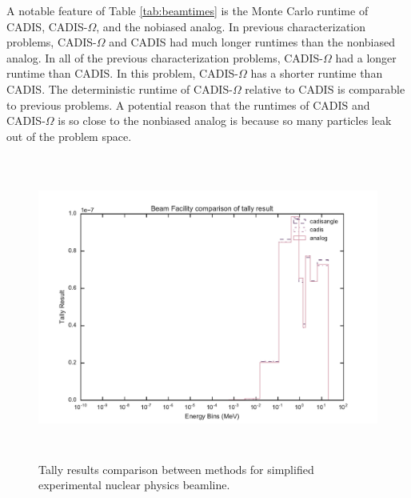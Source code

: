 A notable feature of Table \ref{tab:beamtimes} is the Monte Carlo runtime of
CADIS, CADIS-$\Omega$, and the nobiased analog. In previous characterization
problems, CADIS-$\Omega$ and CADIS had much longer runtimes than the nonbiased
analog. In all of the previous characterization problems, CADIS-$\Omega$ had a
longer runtime than CADIS. In this problem, CADIS-$\Omega$ has a shorter runtime
than CADIS. The deterministic runtime of CADIS-$\Omega$ relative to CADIS
is comparable to previous problems. A potential reason that the runtimes of
CADIS and CADIS-$\Omega$ is so close to the nonbiased analog is because so many
particles leak out of the problem space.

\begin{figure}[h!]
  \centering
  \includegraphics[height=10cm]{./chapters/characterization_probs/figures/char/beam/beam_facility_tally_result_compare.pdf}
  \caption[Tally results comparison between methods for simplified experimental
    nuclear physics beamline.]
  {Tally results comparison between methods for simplified experimental
    nuclear physics beamline.}
  \label{fig:beamresult}
\end{figure}


